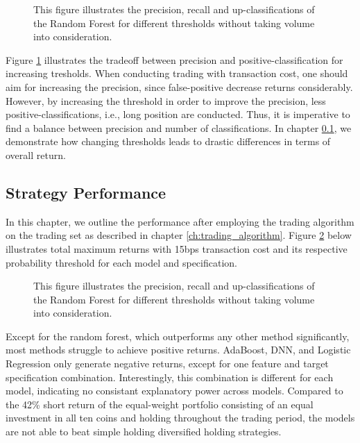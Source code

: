 \begin{figure}[H]
    \captionsetup{format=plain}
    \caption{ 
            This figure illustrates the precision, recall and up-classifications of the Random Forest for different thresholds
            without taking volume into consideration. 
        }
    \label{fig:rf_no_volume_future_2state_movement_120min_precision_vs_threshold}
\end{figure}


Figure \ref{fig:rf_no_volume_future_2state_movement_120min_precision_vs_threshold}
illustrates the tradeoff between precision and positive-classification for increasing tresholds.
When conducting trading with transaction cost, one should aim for increasing the precision, since false-positive decrease returns considerably.
However, by increasing the threshold in order to improve the precision, less positive-classifications, i.e., long position are conducted.
Thus, it is imperative to find a balance between precision and number of classifications.
In chapter \ref{ch:strategy_performance}, we demonstrate how changing thresholds leads to drastic
differences in terms of overall return.




\subsection{Strategy Performance} \label{ch:strategy_performance}

In this chapter, we outline the performance after employing the trading algorithm on the 
trading set as described in chapter \ref{ch:trading_algorithm}.
Figure \ref{fig:all_max_returns_15bps} below illustrates total maximum returns with 15bps transaction cost 
and its respective probability threshold for each model and specification.

\begin{figure}[H]
    \captionsetup{format=plain}
    \caption{ 
            This figure illustrates the precision, recall and up-classifications of the Random Forest for different thresholds
            without taking volume into consideration. 
        }
    \label{fig:all_max_returns_15bps}
\end{figure}

Except for the random forest, which outperforms any other method significantly, most methods struggle to achieve positive returns.
AdaBoost, DNN, and Logistic Regression only generate negative returns, except for one feature and target specification combination.
Interestingly, this combination is different for each model, indicating no consistant explanatory power across models.
Compared to the 42\% short return of the equal-weight portfolio consisting of an equal investment in all ten coins and holding throughout
the trading period, the models are not able to beat simple holding diversified holding strategies.

